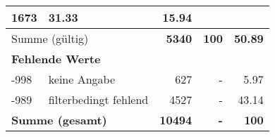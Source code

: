 \begin{longtable}{lXrrr}
       \num{1673} &
       \num[round-mode=places,round-precision=2]{31,33} &
         \num[round-mode=places,round-precision=2]{15,94} \\
     \midrule
     \multicolumn{2}{l}{Summe (gültig)} &
       \textbf{\num{5340}} &
     \textbf{100} &
       \textbf{\num[round-mode=places,round-precision=2]{50,89}} \\
     \multicolumn{5}{l}{\textbf{Fehlende Werte}}\\
       -998 &
       keine Angabe &
         \num{627} &
        - &
         \num[round-mode=places,round-precision=2]{5,97} \\
       -989 &
       filterbedingt fehlend &
         \num{4527} &
        - &
         \num[round-mode=places,round-precision=2]{43,14} \\
     \midrule
     \multicolumn{2}{l}{\textbf{Summe (gesamt)}} &
          \textbf{\num{10494}} &
        \textbf{-} &
        \textbf{100} \\
     \bottomrule
     \end{longtable}
     
